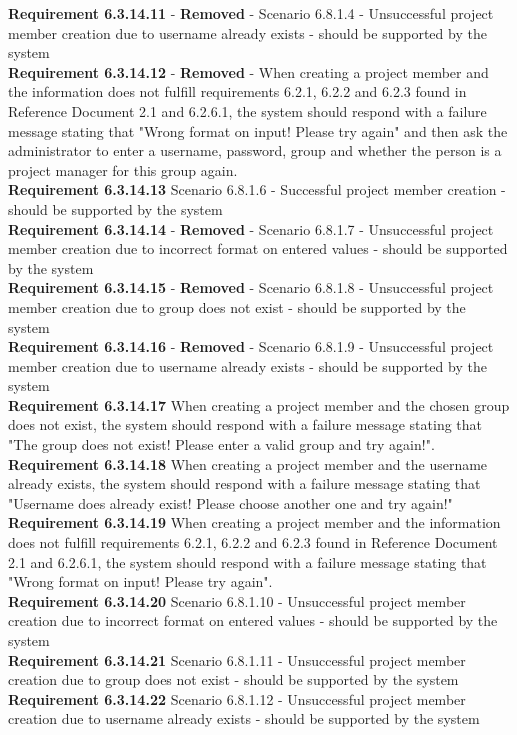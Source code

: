 \documentclass{article}
\begin{document}
\textbf{Requirement 6.3.14.11} - \textbf{Removed} - Scenario 6.8.1.4 - Unsuccessful project member creation due to username already exists - should be supported by the system \\
\textbf{Requirement 6.3.14.12} - \textbf{Removed} - When creating a project member and the information does not fulfill requirements 6.2.1, 6.2.2 and 6.2.3 found in Reference Document 2.1 and 6.2.6.1, the system should respond with a failure message stating that "Wrong format on input! Please try again" and then ask the administrator to enter a username, password, group and whether the person is a project manager for this group again.\\
\textbf{Requirement 6.3.14.13} Scenario 6.8.1.6 - Successful project member creation - should be supported by the system \\
\textbf{Requirement 6.3.14.14} - \textbf{Removed} - Scenario 6.8.1.7 - Unsuccessful project member creation due to incorrect format on entered values - should be supported by the system \\
\textbf{Requirement 6.3.14.15} - \textbf{Removed} - Scenario 6.8.1.8 - Unsuccessful project member creation due to group does not exist - should be supported by the system \\
\textbf{Requirement 6.3.14.16} - \textbf{Removed} - Scenario 6.8.1.9 - Unsuccessful project member creation due to username already exists - should be supported by the system \\
\textbf{Requirement 6.3.14.17} When creating a project member and the chosen group does not exist, the system should respond with a failure message stating that "The group does not exist! Please enter a valid group and try again!". \\
\textbf{Requirement 6.3.14.18} When creating a project member and the username already exists, the system should respond with a failure message stating that "Username does already exist! Please choose another one and try again!"\\
\textbf{Requirement 6.3.14.19} When creating a project member and the information does not fulfill requirements 6.2.1, 6.2.2 and 6.2.3 found in Reference Document 2.1 and 6.2.6.1, the system should respond with a failure message stating that "Wrong format on input! Please try again".\\
\textbf{Requirement 6.3.14.20} Scenario 6.8.1.10 - Unsuccessful project member creation due to incorrect format on entered values - should be supported by the system \\
\textbf{Requirement 6.3.14.21} Scenario 6.8.1.11 - Unsuccessful project member creation due to group does not exist - should be supported by the system \\
\textbf{Requirement 6.3.14.22} Scenario 6.8.1.12 - Unsuccessful project member creation due to username already exists - should be supported by the system \\
\end{document}
